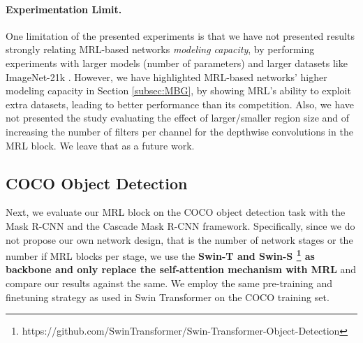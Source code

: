 \documentclass{article}
\begin{document}
\begin{table}[htbp]
\end{table}\paragraph{Experimentation Limit.} One limitation of the presented experiments is that we have not presented results strongly relating MRL-based networks \textit{modeling capacity}, by performing experiments with larger models (number of parameters) and larger datasets like ImageNet-21k \cite{Imagenet}. However, we have highlighted MRL-based networks' higher modeling capacity in Section \ref{subsec:MBG}, by showing MRL's ability to exploit extra datasets, leading to better performance than its competition. Also, we have not presented the study evaluating the effect of larger/smaller region size and of increasing the number of filters per channel for the depthwise convolutions in the MRL block. We leave that as a future work.

\subsection{COCO Object Detection}\label{subsec:COCO}
Next, we evaluate our MRL block on the COCO object detection task with the Mask R-CNN \cite{Mask-RCNN} and the Cascade Mask R-CNN \cite{Cascade_maskrcnn} framework. Specifically, since we do not propose our own network design, that is the number of network stages or the number if MRL blocks per stage, we use the \textbf{Swin-T and Swin-S \cite{DBLP:journals/corr/Swin}\footnote{https://github.com/SwinTransformer/Swin-Transformer-Object-Detection} as backbone and only replace the self-attention mechanism with MRL} and compare our results against the same. We employ the same pre-training and finetuning strategy as used in Swin Transformer \cite{DBLP:journals/corr/Swin} on the COCO training set. 
\end{document}
